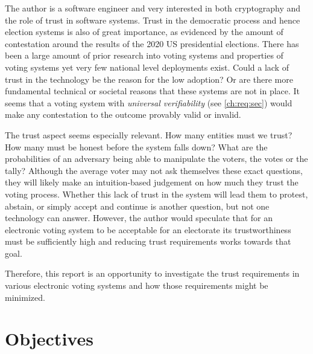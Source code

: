 The author is a software engineer and very interested in both cryptography and the role of trust in software systems. Trust in the democratic process and hence election systems is also of great importance, as evidenced by the amount of contestation around the results of the 2020 US presidential elections. There has been a large amount of prior research into voting systems \cite{
    panjaSecureEndtoendVerifiable2018,
    mccorrySmartContractBoardroom2017,
    liuEvotingProtocolBased2017,
    yangBlockchainVotingPublicly2020,
    spadaforaCoercionResistantBlockchainBasedEVoting2020,
    dimtiriouEfficientCoercionfreeUniversally2019,
    tsoukalasHeliosZeus2013,
    xiaVersatilePretVoter2010,
    ryanPrEtVoterVoterVerifiable2010,
    yuPlatformindependentSecureBlockchainBased2018,
    seifelnasrScalableOpenVoteNetwork2020,
    gajekTrustlessCensorshipResilientScalable2019,
    chillottiHomomorphicLWEBased} and properties of voting systems yet very few national level deployments exist. Could a lack of trust in the technology be the reason for the low adoption? Or are there more fundamental technical or societal reasons that these systems are not in place. It seems that a voting system with \emph{universal verifiability} (see \autoref{ch:req:sec}) would make any contestation to the outcome provably valid or invalid.

The trust aspect seems especially relevant. How many entities must we trust? How many must be honest before the system falls down? What are the probabilities of an adversary being able to manipulate the voters, the votes or the tally? Although the average voter may not ask themselves these exact questions, they will likely make an intuition-based judgement on how much they trust the voting process. Whether this lack of trust in the system will lead them to protest, abstain, or simply accept and continue is another question, but not one technology can answer. However, the author would speculate that for an electronic voting system to be acceptable for an electorate its trustworthiness must be sufficiently high and reducing trust requirements works towards that goal.

Therefore, this report is an opportunity to investigate the trust requirements in various electronic voting systems and how those requirements might be minimized.


\section{Objectives}
\label{ch:intro:object}


